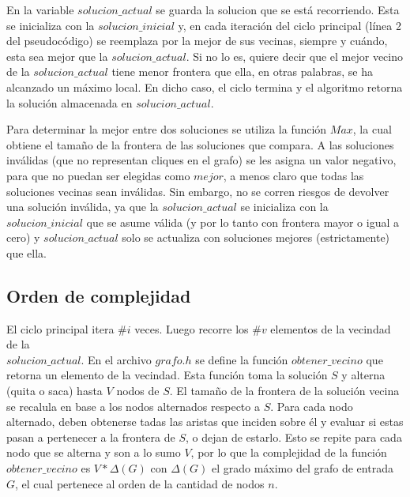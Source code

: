 \par{En la variable $solucion\_actual$ se guarda la solucion que se está
recorriendo. Esta se inicializa con la $solucion\_inicial$ y, en cada
iteración del ciclo principal (línea 2 del pseudocódigo) se reemplaza por la
mejor de sus vecinas, siempre y cuándo, esta sea mejor que la
$solucion\_actual$. Si no lo es, quiere decir que el mejor vecino de la
$solucion\_actual$ tiene menor frontera que ella, en otras palabras, se
ha alcanzado un máximo local. En dicho caso, el ciclo termina y el algoritmo
retorna la solución almacenada en $solucion\_actual$.}\\

\par{Para determinar la mejor entre dos soluciones se utiliza la función $Max$,
la cual obtiene el tamaño de la frontera de las soluciones que compara. A las
soluciones inválidas (que no representan cliques en el grafo) se les asigna
un valor negativo, para que no puedan ser elegidas como $mejor$, a menos claro
que todas las soluciones vecinas sean inválidas. Sin embargo, no se corren
riesgos de devolver una solución inválida, ya que la $solucion\_actual$ se
inicializa con la $solucion\_inicial$ que se asume válida (y por lo tanto con
frontera mayor o igual a cero) y $solucion\_actual$ solo se actualiza con
soluciones mejores (estrictamente) que ella.}

\subsection{Orden de complejidad}

\par{El ciclo principal itera $\#i$ veces. Luego recorre los $\#v$ elementos de
la vecindad de la\\$solucion\_actual$. En el archivo $grafo.h$ se define la
función $obtener\_vecino$ que retorna un elemento de la vecindad. Esta
función toma la solución $S$ y alterna (quita o saca) hasta $V$ nodos de $S$.
El tamaño de la frontera de la solución vecina se recalula en base a los
nodos alternados respecto a $S$. Para cada nodo alternado, deben obtenerse
tadas las aristas que inciden sobre él y evaluar si estas pasan a pertenecer
a la frontera de $S$, o dejan de estarlo. Esto se repite para cada nodo que
se alterna y son a lo sumo $V$, por lo que la complejidad de la función
$obtener\_vecino$ es $V*\Delta(G)$ con $\Delta(G)$ el grado máximo del grafo
de entrada $G$, el cual pertenece al orden de la cantidad de nodos $n$.}\\


